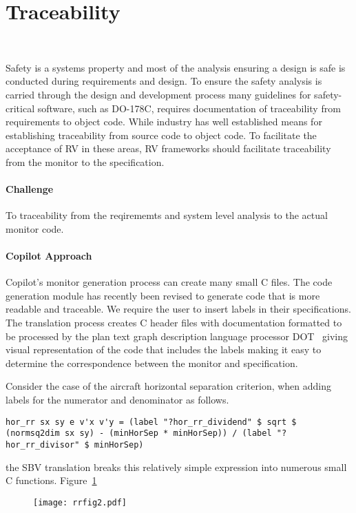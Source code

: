 \section{Traceability}~\label{sec:trace}

Safety is a systems property and most of the analysis ensuring a
design is safe is conducted during requirements and design.  To ensure
the safety analysis is carried through the design and development
process many guidelines for safety-critical software, such as DO-178C,
requires documentation of traceability from requirements to object
code. While industry has well established means for establishing
traceability from source code to object code.  To facilitate the
acceptance of RV in these areas, RV frameworks should facilitate
traceability from the monitor to the specification.

 \paragraph{Challenge} 
To  traceability from the reqirememts and system level analysis to the actual monitor code. 

\paragraph{Copilot Approach} Copilot's monitor generation process can create many small C
files. The code generation module has recently been revised to
generate code that is more readable and traceable.  We require the
user to insert labels in their specifications. The translation process
creates C header files with documentation formatted to be processed by
the plan text graph description language processor  DOT~\cite{ZZZZ}
giving  visual representation of the code  that includes the labels
making it easy to determine the correspondence between the monitor and 
specification.  

Consider the case of the aircraft horizontal
separation criterion, when adding
labels for the numerator and denominator as follows.  
\begin{lstlisting}[frame=single]
hor_rr sx sy e v'x v'y = (label "?hor_rr_dividend" $ sqrt $ (normsq2dim sx sy) - (minHorSep * minHorSep)) / (label "?hor_rr_divisor" $ minHorSep)
\end{lstlisting}  
the SBV translation breaks this relatively simple expression into
numerous small C functions. Figure~\ref{fig:label}

\begin{figure}[ht]
\begin{center}
\texttt{[image: rrfig2.pdf]}
 \label{fig:label}
\end{center}
\end{figure}




